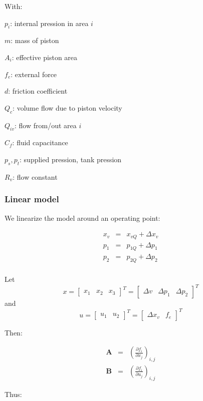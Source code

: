 With:

$p_i$: internal pression in area $i$

$m$: mass of piston

$A_i$: effective piston area

$f_e$: external force

$d$: friction coefficient

$Q_c$: volume flow due to piston velocity

$Q_{iv}$: flow from/out area $i$

$C_f$: fluid capacitance

$p_s, p_t$: supplied pression, tank pression

$R_v$: flow constant


\subsubsection*{Linear model}
We linearize the model around an operating point:

$$\begin{array}{rcl}
   x_v & = & x_{vQ} + \Delta x_v \\
   p_1 & = & p_{1Q} + \Delta p_1 \\
   p_2 & = & p_{2Q} + \Delta p_2 \\
  \end{array}$$

Let $$x = \left[\begin{array}{ccc}x_1 & x_2 & x_3 \end{array}\right]^T = \left[\begin{array}{ccc} \Delta v & \Delta p_1 & \Delta p_2 \end{array}\right]^T$$ and $$u = \left[\begin{array}{cc}u_1 & u_2 \end{array}\right]^T = \left[\begin{array}{cc} \Delta x_v & f_e \end{array}\right]^T$$

Then:

$$ \begin{array}{rcl} 
    \bm{A} & = & \left(\frac{\partial f_i}{\partial x_j}\right)_{i,j} \\
    \bm{B} & = & \left(\frac{\partial f_i}{\partial u_j}\right)_{i,j}
   \end{array}$$
   
Thus:

